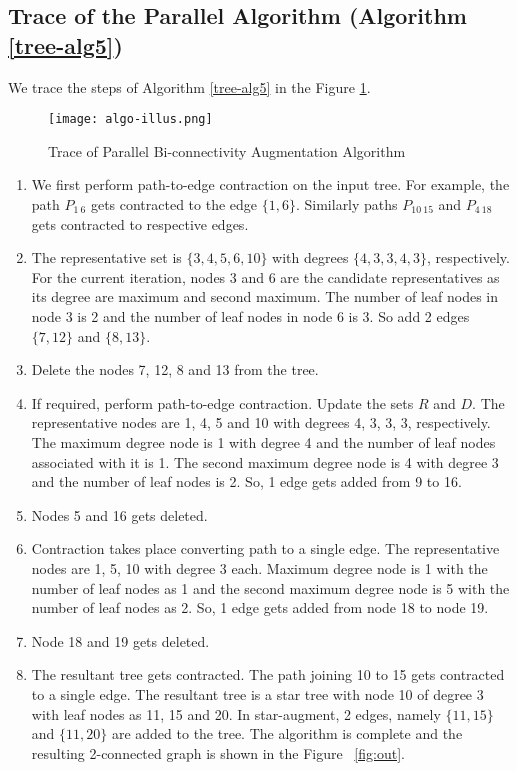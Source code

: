 \documentclass[runningheads]{llncs}
\begin{document}
\subsection{Trace of the Parallel Algorithm (Algorithm \ref{tree-alg5})}
We trace the steps of  Algorithm \ref{tree-alg5} in the Figure \ref{fig:trace}. 
\begin{figure}[htpb]
\begin{center}
\texttt{[image: algo-illus.png]}
\caption {Trace of Parallel Bi-connectivity Augmentation Algorithm}   \label{fig:trace}
\end{center}
\end{figure}
\begin{enumerate}
\item We first perform path-to-edge contraction on the input tree.  For example, the path $P_{1~6}$ gets contracted to the edge $\{1,6\}$. Similarly paths $P_{10~15}$ and $P_{4~18}$ gets contracted to respective edges.
\item The representative set is $\{3, 4, 5, 6, 10\}$ with degrees $\{4, 3, 3, 4, 3\}$, respectively.  For the current iteration, nodes 3 and 6 are the candidate representatives as its degree are maximum and second maximum.  The number of leaf nodes in node 3 is 2 and the number of leaf nodes in node 6 is 3.  So add 2 edges $\{7,12\}$ and  $\{8,13\}$.
\item Delete the nodes 7, 12, 8 and 13 from the tree.
\item If required, perform path-to-edge contraction.  Update the sets $R$ and $D$.  The representative nodes are 1, 4, 5 and 10 with degrees 4, 3, 3, 3, respectively.  The maximum degree node is 1 with degree 4 and the number of leaf nodes associated with it is 1.  The second maximum degree node is 4 with degree 3 and the number of leaf nodes is 2. So, 1 edge gets added from 9 to 16.
\item Nodes 5 and 16 gets deleted.
\item Contraction takes place converting path to a single edge.  The representative nodes are 1, 5, 10 with degree 3 each.  Maximum degree node is 1 with the number of leaf nodes as 1 and the second maximum degree node is 5 with the number of leaf nodes as 2. So, 1 edge gets added from node 18 to node 19.
\item Node 18 and 19 gets deleted.
\item The resultant tree gets contracted. The path joining 10 to 15 gets contracted to a single edge. The resultant tree is a star tree with node 10 of degree 3 with leaf nodes as 11, 15 and 20.  In star-augment, 2 edges, namely $\{11,15\}$ and $\{11,20\}$ are added to the tree.  The algorithm is complete and the resulting 2-connected graph is shown in the  Figure ~\ref{fig:out}. 
\end{enumerate}
\end{document}
